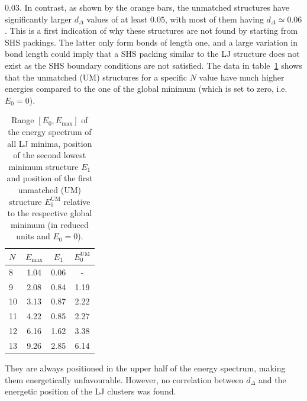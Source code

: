 $0.03$.  In contrast, as shown by the orange bars, the unmatched structures have
significantly larger $d_\Delta$ values of at least $0.05$, with most of them
having $d_{\Delta} \simeq 0.06$. This is a first indication of why these
structures are not found by starting from \ac{SHS} packings. The latter only
form bonds of length one, and a large variation in bond length could imply that
a \ac{SHS} packing similar to the \ac{LJ} structure does not exist as the
\ac{SHS} boundary conditions are not satisfied. The data in
table~\ref{tab:energies} shows that the unmatched (UM) structures for a specific
$N$ value have much higher energies compared to the one of the global minimum
(which is set to zero, i.e. $E_0=0$).
%
\begin{table}[htb]\centering
    \caption{Range $[E_0,E_\text{max}]$ of the energy spectrum of all LJ
    minima, position of the second lowest minimum structure $E_1$ and position
    of the first unmatched (UM) structure $E_0^\text{UM}$ relative to the
    respective global minimum (in reduced units and $E_0=0$).}
    \label{tab:energies}
        \begin{tabular}{lccc}\toprule
        $N$ & $E_\text{max}$ & $E_1$ & $E_0^\text{UM}$ \\\midrule
        8   & 1.04   & 0.06    & -           \\
        9   & 2.08   & 0.84    & 1.19        \\
        10  & 3.13   & 0.87    & 2.22        \\
        11  & 4.22   & 0.85    & 2.27        \\
        12  & 6.16   & 1.62    & 3.38        \\
        13  & 9.26   & 2.85    & 6.14        \\\bottomrule
        \end{tabular}
\end{table}%
%
They are always positioned in the upper half of the energy spectrum, making them
energetically unfavourable.  However, no correlation between $d_\Delta$ and the
energetic position of the \ac{LJ} clusters was found.


